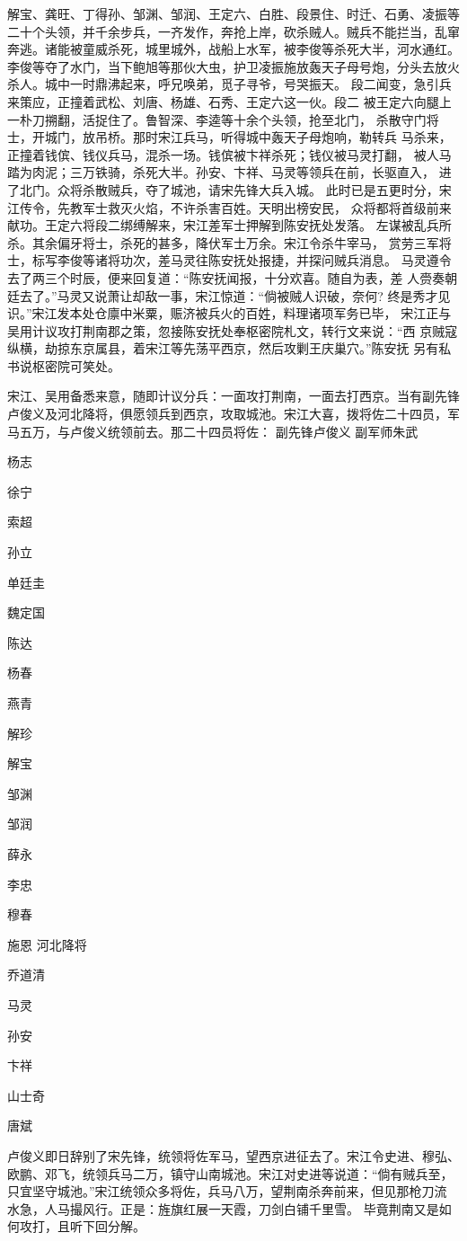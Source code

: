 解宝、龚旺、丁得孙、邹渊、邹润、王定六、白胜、段景住、时迁、石勇、凌振等
二十个头领，并千余步兵，一齐发作，奔抢上岸，砍杀贼人。贼兵不能拦当，乱窜
奔逃。诸能被童威杀死，城里城外，战船上水军，被李俊等杀死大半，河水通红。
李俊等夺了水门，当下鲍旭等那伙大虫，护卫凌振施放轰天子母号炮，分头去放火
杀人。城中一时鼎沸起来，呼兄唤弟，觅子寻爷，号哭振天。
段二闻变，急引兵来策应，正撞着武松、刘唐、杨雄、石秀、王定六这一伙。段二
被王定六向腿上一朴刀搠翻，活捉住了。鲁智深、李逵等十余个头领，抢至北门，
杀散守门将士，开城门，放吊桥。那时宋江兵马，听得城中轰天子母炮响，勒转兵
马杀来，正撞着钱傧、钱仪兵马，混杀一场。钱傧被卞祥杀死；钱仪被马灵打翻，
被人马踏为肉泥；三万铁骑，杀死大半。孙安、卞祥、马灵等领兵在前，长驱直入，
进了北门。众将杀散贼兵，夺了城池，请宋先锋大兵入城。
此时已是五更时分，宋江传令，先教军士救灭火焰，不许杀害百姓。天明出榜安民，
众将都将首级前来献功。王定六将段二绑缚解来，宋江差军士押解到陈安抚处发落。
左谋被乱兵所杀。其余偏牙将士，杀死的甚多，降伏军士万余。宋江令杀牛宰马，
赏劳三军将士，标写李俊等诸将功次，差马灵往陈安抚处报捷，并探问贼兵消息。
马灵遵令去了两三个时辰，便来回复道：“陈安抚闻报，十分欢喜。随自为表，差
人赍奏朝廷去了。”马灵又说萧让却敌一事，宋江惊道：“倘被贼人识破，奈何?
终是秀才见识。”宋江发本处仓廪中米粟，赈济被兵火的百姓，料理诸项军务已毕，
宋江正与吴用计议攻打荆南郡之策，忽接陈安抚处奉枢密院札文，转行文来说：“西
京贼寇纵横，劫掠东京属县，着宋江等先荡平西京，然后攻剿王庆巢穴。”陈安抚
另有私书说枢密院可笑处。

宋江、吴用备悉来意，随即计议分兵：一面攻打荆南，一面去打西京。当有副先锋
卢俊义及河北降将，俱愿领兵到西京，攻取城池。宋江大喜，拨将佐二十四员，军
马五万，与卢俊义统领前去。那二十四员将佐：
副先锋卢俊义
副军师朱武

杨志

徐宁

索超

孙立

单廷圭

魏定国

陈达

杨春

燕青

解珍

解宝

邹渊

邹润

薛永

李忠

穆春

施恩
河北降将

乔道清

马灵

孙安

卞祥

山士奇

唐斌

卢俊义即日辞别了宋先锋，统领将佐军马，望西京进征去了。宋江令史进、穆弘、
欧鹏、邓飞，统领兵马二万，镇守山南城池。宋江对史进等说道：“倘有贼兵至，
只宜坚守城池。”宋江统领众多将佐，兵马八万，望荆南杀奔前来，但见那枪刀流
水急，人马撮风行。正是：旌旗红展一天霞，刀剑白铺千里雪。
毕竟荆南又是如何攻打，且听下回分解。